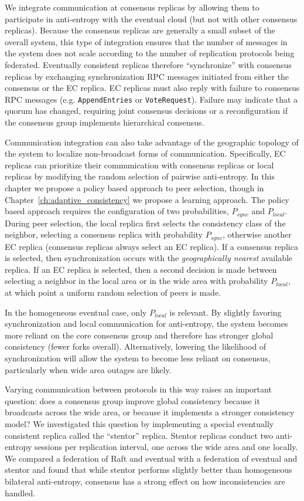 We integrate communication at consensus replicas by allowing them to participate in anti-entropy with the eventual cloud (but not with other consensus replicas).
Because the consensus replicas are generally a small subset of the overall system, this type of integration ensures that the number of messages in the system does not scale according to the number of replication protocols being federated.
Eventually consistent replicas therefore ``synchronize'' with consensus replicas by exchanging synchronization RPC messages initiated from either the consensus or the EC replica.
EC replicas must also reply with failure to consensus RPC messages (e.g. \texttt{AppendEntries} or \texttt{VoteRequest}).
Failure may indicate that a quorum has changed, requiring joint consensus decisions or a reconfiguration if the consensus group implements hierarchical consensus.

Communication integration can also take advantage of the geographic topology of the system to localize non-broadcast forms of communication.
Specifically, EC replicas can prioritize their communication with consensus replicas or local replicas by modifying the random selection of pairwise anti-entropy.
In this chapter we propose a policy based approach to peer selection, though in Chapter~\ref{ch:adaptive_consistency} we propose a learning approach.
The policy based approach requires the configuration of two probabilities, $P_{sync}$ and $P_{local}$.
During peer selection, the local replica first selects the consistency class of the neighbor, selecting a consensus replica with probability $P_{sync}$, otherwise another EC replica (consensus replicas always select an EC replica).
If a consensus replica is selected, then synchronization occurs with the \emph{geographically nearest} available replica.
If an EC replica is selected, then a second decision is made between selecting a neighbor in the local area or in the wide area with probability $P_{local}$, at which point a uniform random selection of peers is made.

In the homogeneous eventual case, only $P_{local}$ is relevant.
By slightly favoring synchronization and local communication for anti-entropy, the system becomes more reliant on the core consensus group and therefore has stronger global consistency (fewer forks overall).
Alternatively, lowering the likelihood of synchronization will allow the system to become less reliant on consensus, particularly when wide area outages are likely.

Varying communication between protocols in this way raises an important question: does a consensus group improve global consistency because it broadcasts across the wide area, or because it implements a stronger consistency model?
We investigated this question by implementing a special eventually consistent replica called the ``stentor'' replica.
Stentor replicas conduct two anti-entropy sessions per replication interval, one across the wide area and one locally.
We compared a federation of Raft and eventual with a federation of eventual and stentor and found that while stentor performs slightly better than homogeneous bilateral anti-entropy, consensus has a strong effect on how inconsistencies are handled.

